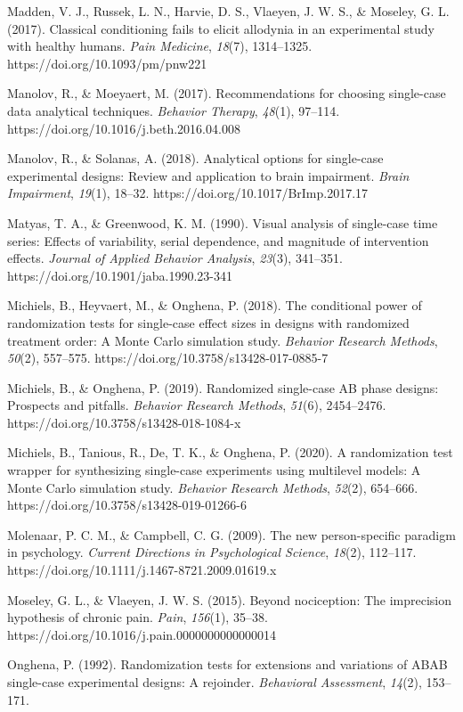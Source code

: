 \documentclass{article}
\begin{document}
Madden, V. J., Russek, L. N., Harvie, D. S., Vlaeyen, J. W. S., \& Moseley, G. L. (2017). Classical conditioning fails to elicit allodynia in an experimental study with healthy humans. \emph{Pain Medicine}, \emph{18}(7), 1314--1325. https://doi.org/10.1093/pm/pnw221

Manolov, R., \& Moeyaert, M. (2017). Recommendations for choosing single-case data analytical techniques. \emph{Behavior Therapy}, \emph{48}(1), 97--114. https://doi.org/10.1016/j.beth.2016.04.008

Manolov, R., \& Solanas, A. (2018). Analytical options for single-case experimental designs: Review and application to brain impairment. \emph{Brain Impairment}, \emph{19}(1), 18--32. https://doi.org/10.1017/BrImp.2017.17

Matyas, T. A., \& Greenwood, K. M. (1990). Visual analysis of single-case time series: Effects of variability, serial dependence, and magnitude of intervention effects. \emph{Journal of Applied Behavior Analysis}, \emph{23}(3), 341--351. https://doi.org/10.1901/jaba.1990.23-341

Michiels, B., Heyvaert, M., \& Onghena, P. (2018). The conditional power of randomization tests for single-case effect sizes in designs with randomized treatment order: A Monte Carlo simulation study. \emph{Behavior Research Methods}, \emph{50}(2), 557--575. https://doi.org/10.3758/s13428-017-0885-7

Michiels, B., \& Onghena, P. (2019). Randomized single-case AB phase designs: Prospects and pitfalls. \emph{Behavior Research Methods}, \emph{51}(6), 2454--2476. https://doi.org/10.3758/s13428-018-1084-x

Michiels, B., Tanious, R., De, T. K., \& Onghena, P. (2020). A randomization test wrapper for synthesizing single-case experiments using multilevel models: A Monte Carlo simulation study. \emph{Behavior Research Methods}, \emph{52}(2), 654--666. https://doi.org/10.3758/s13428-019-01266-6

Molenaar, P. C. M., \& Campbell, C. G. (2009). The new person-specific paradigm in psychology. \emph{Current Directions in Psychological Science}, \emph{18}(2), 112--117. https://doi.org/10.1111/j.1467-8721.2009.01619.x

Moseley, G. L., \& Vlaeyen, J. W. S. (2015). Beyond nociception: The imprecision hypothesis of chronic pain. \emph{Pain}, \emph{156}(1), 35--38. https://doi.org/10.1016/j.pain.0000000000000014

Onghena, P. (1992). Randomization tests for extensions and variations of ABAB single-case experimental designs: A rejoinder. \emph{Behavioral Assessment}, \emph{14}(2), 153--171.
\end{document}
